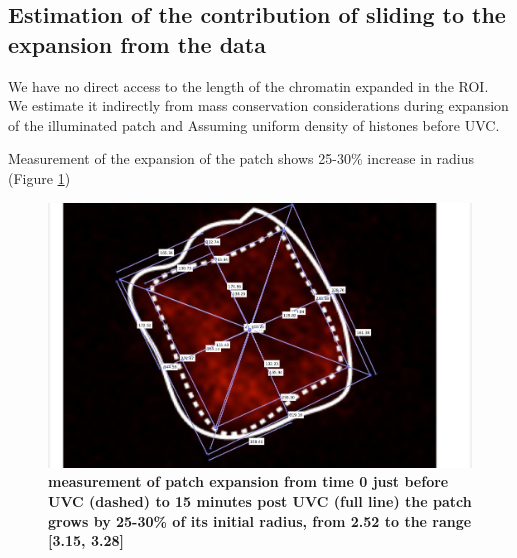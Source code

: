 \documentclass[12pt]{report}
\begin{document}
%		
		
									
		\subsection{Estimation of the contribution of sliding to the expansion from the data}\label{subsection:estimationOfSlidingRadiusFromTheData}
		We have no direct access to the length of the chromatin expanded in the ROI. We estimate it indirectly from mass conservation considerations during expansion of the illuminated patch and Assuming uniform density of histones before UVC. 
		
		Measurement of the expansion of the patch shows 25-30\% increase in radius (Figure \ref{fig:patchExpansionMeasurement})
		\begin{figure}[H]
			\centering
			\includegraphics[width=0.5\linewidth, height=0.3\textheight]{Images/PatchExpansion/patchExpansionMeasurement}
			\caption{\tiny{\textbf{measurement of patch expansion from time 0  just before UVC (dashed) to 15 minutes post UVC (full line) the patch grows by 25-30\% of its initial radius, from 2.52 to the range [3.15,  3.28] }}}
			\label{fig:patchExpansionMeasurement}
		\end{figure}
		
\end{document}
